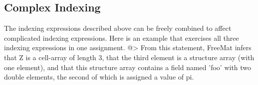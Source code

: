 \subsection{Complex Indexing}

The indexing expressions described above can be freely combined
to affect complicated indexing expressions.  Here is an example
that exercises all three indexing expressions in one assignment.
@>
From this statement, FreeMat infers that Z is a cell-array of 
length 3, that the third element is a structure array (with one
element), and that this structure array contains a field named
'foo' with two double elements, the second of which is assigned
a value of pi.
